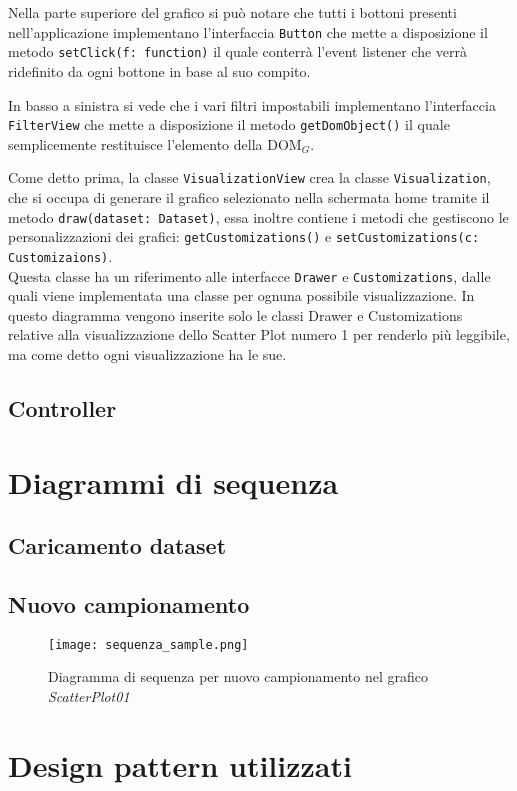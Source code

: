 Nella parte superiore del grafico si può notare che tutti i bottoni presenti nell'applicazione implementano l'interfaccia \texttt{Button} che mette a disposizione il metodo \texttt{setClick(f: function)} il quale conterrà l'event listener che verrà ridefinito da ogni bottone in base al suo compito.

In basso a sinistra si vede che i vari filtri impostabili implementano l'interfaccia \texttt{FilterView} che mette a disposizione il metodo \texttt{getDomObject()} il quale semplicemente restituisce l'elemento della DOM$_G$.

Come detto prima, la classe \texttt{VisualizationView} crea la classe \texttt{Visualization}, che si occupa di generare il grafico selezionato nella schermata home tramite il metodo \texttt{draw(dataset: Dataset)}, essa inoltre contiene i metodi che gestiscono le personalizzazioni dei grafici: \texttt{getCustomizations()} e \texttt{setCustomizations(c: Customizaions)}. \\Questa classe ha un riferimento alle interfacce \texttt{Drawer} e \texttt{Customizations}, dalle quali viene implementata una classe per ognuna possibile visualizzazione. In questo diagramma vengono inserite solo le classi Drawer e Customizations relative alla visualizzazione dello Scatter Plot numero 1 per renderlo più leggibile, ma come detto ogni visualizzazione ha le sue.
\subsection{Controller}
\section{Diagrammi di sequenza}
\subsection{Caricamento dataset}
\subsection{Nuovo campionamento}
\begin{figure}[H]
    \texttt{[image: sequenza\_sample.png]}
    \caption{Diagramma di sequenza per nuovo campionamento nel grafico \textit{ScatterPlot01}}
\end{figure}
\section{Design pattern utilizzati}
